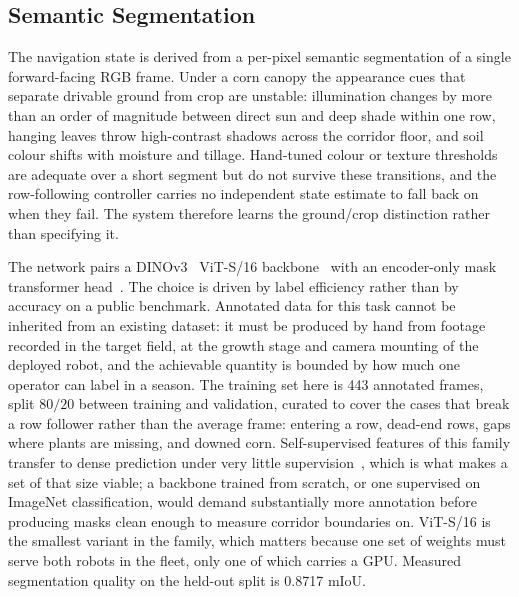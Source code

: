 \documentclass[conference]{IEEEtran}
\begin{document}
\subsection{Semantic Segmentation}
The navigation state is derived from a per-pixel semantic segmentation of a
single forward-facing RGB frame. Under a corn canopy the appearance cues that
separate drivable ground from crop are unstable: illumination changes by more
than an order of magnitude between direct sun and deep shade within one row,
hanging leaves throw high-contrast shadows across the corridor floor, and soil
colour shifts with moisture and tillage. Hand-tuned colour or texture thresholds
are adequate over a short segment but do not survive these transitions, and the
row-following controller carries no independent state estimate to fall back on
when they fail. The system therefore learns the ground/crop distinction rather
than specifying it.

The network pairs a DINOv3~\cite{simeoni2025dinov3} ViT-S/16
backbone~\cite{ref14} with an encoder-only mask transformer head~\cite{ref16}.
The choice is driven by label efficiency rather than by accuracy on a public
benchmark. Annotated data for this task cannot be inherited from an existing
dataset: it must be produced by hand from footage recorded in the target field,
at the growth stage and camera mounting of the deployed robot, and the
achievable quantity is bounded by how much one operator can label in a season.
The training set here is 443 annotated frames, split $80/20$ between training
and validation, curated to cover the cases that break a row follower rather than
the average frame: entering a row, dead-end rows, gaps where plants are missing,
and downed corn. Self-supervised features of this family transfer to dense
prediction under very little supervision~\cite{ref15}, which is what makes a set
of that size viable; a backbone trained from scratch, or one supervised on
ImageNet classification, would demand substantially more annotation before
producing masks clean enough to measure corridor boundaries on. ViT-S/16 is the
smallest variant in the family, which matters because one set of weights must
serve both robots in the fleet, only one of which carries a GPU. Measured
segmentation quality on the held-out split is 0.8717 mIoU.
\end{document}
